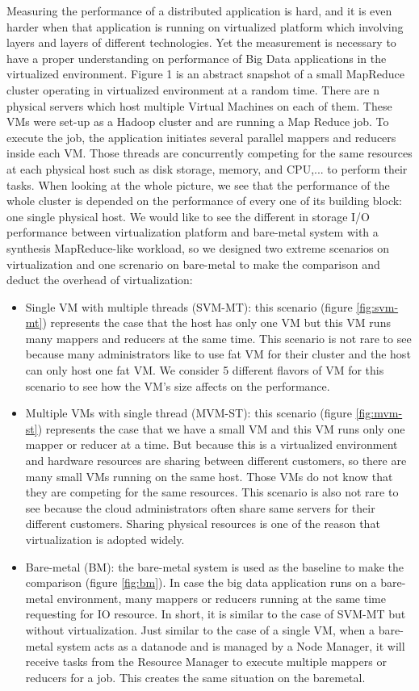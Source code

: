 \documentclass{acmsig}
\begin{document}
Measuring the performance of a distributed application is hard, and it is even harder when that application is running on virtualized platform which involving layers and layers of different technologies. Yet the measurement is necessary to have a proper understanding on performance of Big Data applications in the virtualized environment. Figure 1 is an abstract snapshot of a small MapReduce cluster operating in virtualized environment at a random time. There are n physical servers which host multiple Virtual Machines on each of them. These VMs were set-up as a Hadoop cluster and are running a Map Reduce job. To execute the job, the application initiates several parallel mappers and reducers inside each VM. Those threads are concurrently competing for the same resources at each physical host such as disk storage, memory, and CPU,... to perform their tasks. When looking at the whole picture, we see that the performance of the whole cluster is depended on the performance of every one of its building block: one single physical host. We would like to see the different in storage I/O performance between virtualization platform and bare-metal system with a synthesis MapReduce-like workload, so we designed two extreme scenarios on virtualization and one screnario on bare-metal to make the comparison and deduct the overhead of virtualization:
\begin{itemize}
\item Single VM with multiple threads (SVM-MT): this scenario (figure \ref{fig:svm-mt}) represents the case that the host has only one VM but this VM runs many mappers and reducers at the same time. This scenario is not rare to see because many administrators like to use fat VM for their cluster and the host can only host one fat VM. We consider 5 different flavors of VM for this scenario to see how the VM's size affects on the performance.
\item Multiple VMs with single thread (MVM-ST): this scenario (figure \ref{fig:mvm-st}) represents the case that we have a small VM and this VM runs only one mapper or reducer at a time. But because this is a virtualized environment and hardware resources are sharing between different customers, so there are many small VMs running on the same host. Those VMs do not know that they are competing for the same resources. This scenario is also not rare to see because the cloud administrators often share same servers for their different customers. Sharing physical resources is one of the reason that virtualization is adopted widely.
\item Bare-metal (BM): the bare-metal system is used as the baseline to make the comparison (figure \ref{fig:bm}). In case the big data application runs on a bare-metal environment, many mappers or reducers running at the same time requesting for IO resource. In short, it is similar to the case of SVM-MT but without virtualization. Just similar to the case of a single VM, when a bare-metal system acts as a datanode and is managed by a Node Manager, it will receive tasks from the Resource Manager to execute multiple mappers or reducers for a job. This creates the same situation on the baremetal.
\end{itemize}
\end{document}
